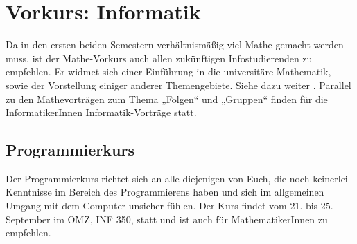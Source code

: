 \section{Vorkurs: Informatik}
\label{vkinfo}
Da in den ersten beiden Semestern verhältnismäßig viel Mathe gemacht werden muss, ist der Mathe-Vorkurs auch allen zukünftigen Infostudierenden zu empfehlen. Er widmet sich einer Einführung in die universitäre Mathematik, sowie der Vorstellung einiger anderer Themengebiete. Siehe dazu weiter
.
Parallel zu den Mathevorträgen zum Thema „Folgen“ und „Gruppen“ finden für die InformatikerInnen Informatik-Vorträge statt.

\parskip

\subsection{Programmierkurs}
Der Programmierkurs richtet sich an alle diejenigen von Euch, die noch keinerlei Kenntnisse im Bereich des Programmierens haben und sich im allgemeinen Umgang mit dem Computer unsicher fühlen. Der Kurs findet vom 21. bis 25. September im OMZ, \gls{INF} 350, statt und ist auch für MathematikerInnen zu empfehlen.




